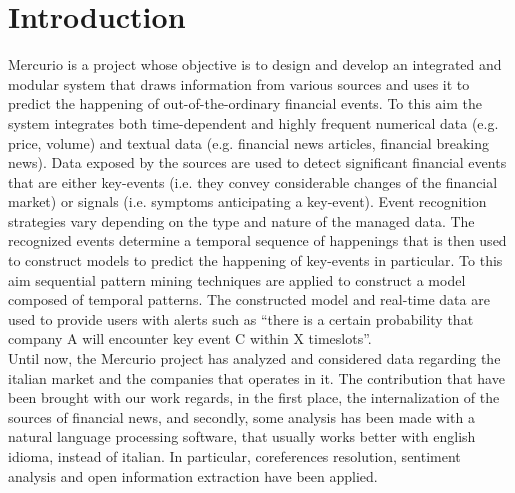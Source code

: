 \section{Introduction}
Mercurio is a project whose objective is to design and develop an integrated and modular system that draws information from various sources and uses it to predict the happening of out-of-the-ordinary financial events. To this aim the system integrates both time-dependent and highly frequent numerical data (e.g. price, volume) and textual data (e.g. financial news articles, financial breaking news).
Data exposed by the sources are used to detect significant financial events that are either key-events (i.e. they convey considerable changes of the financial market) or signals (i.e. symptoms anticipating a key-event). Event recognition strategies vary depending on the type and nature of the managed data. The recognized events determine a temporal sequence of happenings that is then used to construct models to predict the happening of key-events in particular. To this aim sequential pattern mining techniques are applied to construct a model composed of temporal patterns. The constructed model and real-time data are used to provide users with alerts such as “there is a certain probability that company A will encounter key event C within X timeslots”. \\
Until now, the Mercurio project has analyzed and considered data regarding the italian market and the companies that operates in it. The contribution that have been brought with our work regards, in the first place, the internalization of the sources of financial news, and secondly, some analysis has been made with a natural language processing software, that usually works better with english idioma, instead of italian. In particular, coreferences resolution, sentiment analysis and open information extraction have been applied. \\